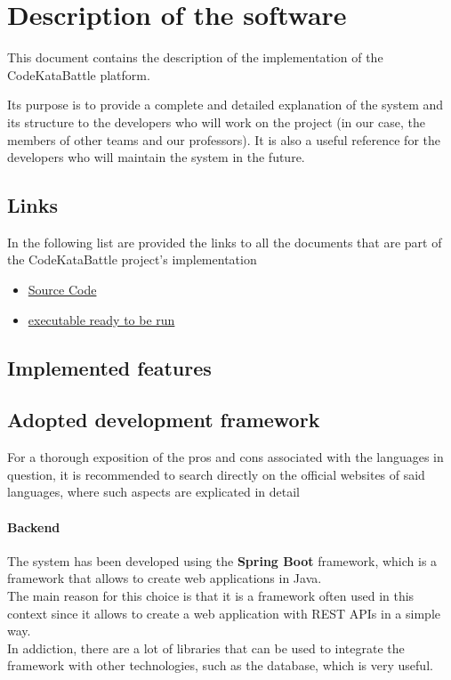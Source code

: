 \chapter{Description of the software}

This document contains the description of the implementation of the CodeKataBattle platform.

Its purpose is to provide a complete and detailed explanation of the system and its structure to the developers who will work on the project (in our case, the members of other teams and our professors). It is also a useful reference for the developers who will maintain the system in the future.

\section{Links}
In the following list are provided the links to all the documents that are part of the CodeKataBattle project's implementation

\begin{itemize}
    \item \href{https://github.com/pontig/sw-eng-2-PasiniPontiggiaStasi/tree/main/ITD/CodeKataBattle}{Source Code}
    \item \href{https://github.com/pontig/sw-eng-2-PasiniPontiggiaStasi/tree/main/ITD/CodeKataBattle/out/artifacts/CodeKataBattle_jar}{executable ready to be run}
\end{itemize}

\section{Implemented features}



\section{Adopted development framework}

For a thorough exposition of the pros and cons associated with the languages in question, it is recommended to search directly on the official websites of said languages, where such aspects are explicated in detail

\subsubsection{Backend}
The system has been developed using the \textbf{Spring Boot} framework, which is a framework that allows to create web applications in Java.\\
The main reason for this choice is that it is a framework often used in this context since it allows to create a web application with REST APIs in a simple way.\\In addiction, there are a lot of libraries that can be used to integrate the framework with other technologies, such as the database, which is very useful.\\

